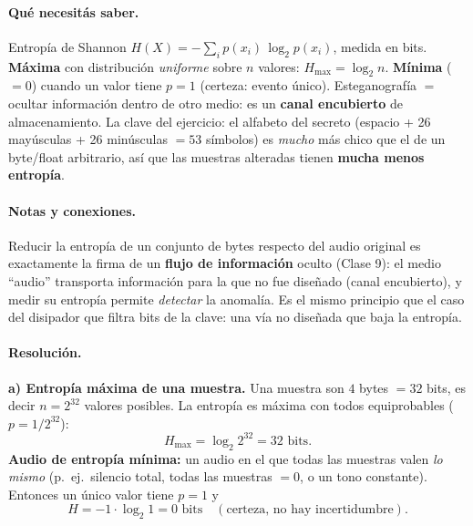 \paragraph{Qué necesitás saber.} Entropía de Shannon $H(X) = -\sum_i p(x_i)\,\log_2 p(x_i)$,
medida en bits. \textbf{Máxima} con distribución \emph{uniforme} sobre $n$ valores:
$H_{\max} = \log_2 n$. \textbf{Mínima} ($=0$) cuando un valor tiene $p=1$ (certeza: evento
único). Esteganografía $=$ ocultar información dentro de otro medio: es un \textbf{canal
encubierto} de almacenamiento. La clave del ejercicio: el alfabeto del secreto (espacio + 26
mayúsculas + 26 minúsculas $= 53$ símbolos) es \emph{mucho} más chico que el de un byte/float
arbitrario, así que las muestras alteradas tienen \textbf{mucha menos entropía}.

\paragraph{Notas y conexiones.} Reducir la entropía de un conjunto de bytes respecto del audio
original es exactamente la firma de un \textbf{flujo de información} oculto (Clase 9): el medio
``audio'' transporta información para la que no fue diseñado (canal encubierto), y medir su
entropía permite \emph{detectar} la anomalía. Es el mismo principio que el caso del disipador
que filtra bits de la clave: una vía no diseñada que baja la entropía.

\paragraph{Resolución.}
\textbf{a) Entropía máxima de una muestra.} Una muestra son $4$ bytes $= 32$ bits, es decir
$n = 2^{32}$ valores posibles. La entropía es máxima con todos equiprobables
($p = 1/2^{32}$):
\begin{equation*}
  H_{\max} = \log_2 2^{32} = \boxed{32 \text{ bits}}.
\end{equation*}
\textbf{Audio de entropía mínima:} un audio en el que todas las muestras valen \emph{lo mismo}
(p.\ ej.\ silencio total, todas las muestras $=0$, o un tono constante). Entonces un único valor
tiene $p=1$ y
\begin{equation*}
  H = -1 \cdot \log_2 1 = 0 \text{ bits} \quad (\text{certeza, no hay incertidumbre}).
\end{equation*}

